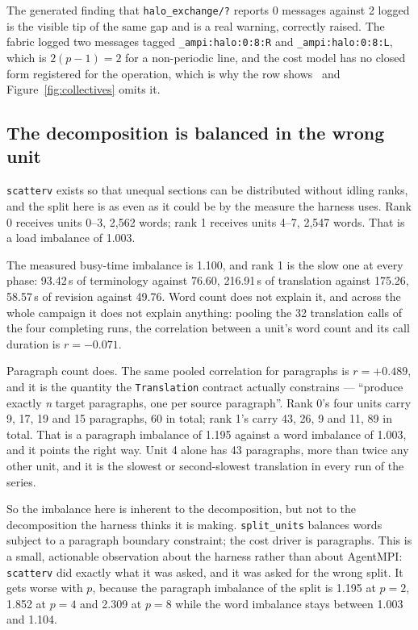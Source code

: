 \documentclass[11pt]{article}
\begin{document}
The generated finding that \texttt{halo\_exchange/?} reports 0 messages against 2 logged is the
visible tip of the same gap and is a real warning, correctly raised. The fabric logged two
messages tagged \texttt{\_ampi:halo:0:8:R} and \texttt{\_ampi:halo:0:8:L}, which is $2(p-1)=2$ for
a non-periodic line, and the cost model has no closed form registered for the operation, which is
why the row shows \modelna\ and Figure~\ref{fig:collectives} omits it.

\subsection*{The decomposition is balanced in the wrong unit}

\texttt{scatterv} exists so that unequal sections can be distributed without idling ranks, and the
split here is as even as it could be by the measure the harness uses. Rank 0 receives units 0--3,
2{,}562 words; rank 1 receives units 4--7, 2{,}547 words. That is a load imbalance of 1.003.

The measured busy-time imbalance is 1.100, and rank 1 is the slow one at every phase: 93.42\,s of
terminology against 76.60, 216.91\,s of translation against 175.26, 58.57\,s of revision against
49.76. Word count does not explain it, and across the whole campaign it does not explain anything:
pooling the 32 translation calls of the four completing runs, the correlation between a unit's
word count and its call duration is $r=-0.071$.

Paragraph count does. The same pooled correlation for paragraphs is $r=+0.489$, and it is the
quantity the \texttt{Translation} contract actually constrains --- ``produce exactly
\emph{n} target paragraphs, one per source paragraph''. Rank 0's four units carry 9, 17, 19 and 15
paragraphs, 60 in total; rank 1's carry 43, 26, 9 and 11, 89 in total. That is a paragraph
imbalance of 1.195 against a word imbalance of 1.003, and it points the right way. Unit 4 alone
has 43 paragraphs, more than twice any other unit, and it is the slowest or second-slowest
translation in every run of the series.

So the imbalance here is inherent to the decomposition, but not to the decomposition the harness
thinks it is making. \texttt{split\_units} balances words subject to a paragraph boundary
constraint; the cost driver is paragraphs. This is a small, actionable observation about the
harness rather than about AgentMPI: \texttt{scatterv} did exactly what it was asked, and it was
asked for the wrong split. It gets worse with $p$, because the paragraph imbalance of the split is
1.195 at $p=2$, 1.852 at $p=4$ and 2.309 at $p=8$ while the word imbalance stays between 1.003 and
1.104.
\end{document}
